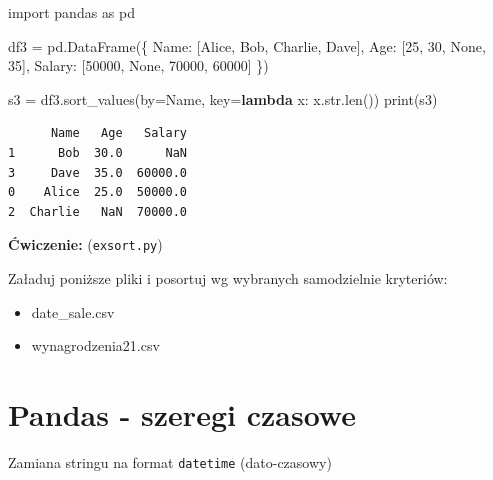 \documentclass[
  polish,
  letterpaper,
  DIV=11,
  numbers=noendperiod]{scrreprt}
\newenvironment{Shaded}{\begin{snugshade}}{\end{snugshade}}
\newcommand{\BuiltInTok}[1]{\textcolor[rgb]{0.00,0.23,0.31}{#1}}
\newcommand{\DecValTok}[1]{\textcolor[rgb]{0.68,0.00,0.00}{#1}}
\newcommand{\ImportTok}[1]{\textcolor[rgb]{0.00,0.46,0.62}{#1}}
\newcommand{\KeywordTok}[1]{\textcolor[rgb]{0.00,0.23,0.31}{\textbf{#1}}}
\newcommand{\NormalTok}[1]{\textcolor[rgb]{0.00,0.23,0.31}{#1}}
\newcommand{\OperatorTok}[1]{\textcolor[rgb]{0.37,0.37,0.37}{#1}}
\newcommand{\StringTok}[1]{\textcolor[rgb]{0.13,0.47,0.30}{#1}}
\newcommand{\VariableTok}[1]{\textcolor[rgb]{0.07,0.07,0.07}{#1}}
\begin{document}
\begin{Shaded}
\begin{Highlighting}[]
\ImportTok{import}\NormalTok{ pandas }\ImportTok{as}\NormalTok{ pd}

\NormalTok{df3 }\OperatorTok{=}\NormalTok{ pd.DataFrame(\{}
    \StringTok{\textquotesingle{}Name\textquotesingle{}}\NormalTok{: [}\StringTok{\textquotesingle{}Alice\textquotesingle{}}\NormalTok{, }\StringTok{\textquotesingle{}Bob\textquotesingle{}}\NormalTok{, }\StringTok{\textquotesingle{}Charlie\textquotesingle{}}\NormalTok{, }\StringTok{\textquotesingle{}Dave\textquotesingle{}}\NormalTok{],}
    \StringTok{\textquotesingle{}Age\textquotesingle{}}\NormalTok{: [}\DecValTok{25}\NormalTok{, }\DecValTok{30}\NormalTok{, }\VariableTok{None}\NormalTok{, }\DecValTok{35}\NormalTok{],}
    \StringTok{\textquotesingle{}Salary\textquotesingle{}}\NormalTok{: [}\DecValTok{50000}\NormalTok{, }\VariableTok{None}\NormalTok{, }\DecValTok{70000}\NormalTok{, }\DecValTok{60000}\NormalTok{]}
\NormalTok{\})}

\NormalTok{s3 }\OperatorTok{=}\NormalTok{ df3.sort\_values(by}\OperatorTok{=}\StringTok{\textquotesingle{}Name\textquotesingle{}}\NormalTok{, key}\OperatorTok{=}\KeywordTok{lambda}\NormalTok{ x: x.}\BuiltInTok{str}\NormalTok{.}\BuiltInTok{len}\NormalTok{())}
\BuiltInTok{print}\NormalTok{(s3)}
\end{Highlighting}
\end{Shaded}

\begin{verbatim}
      Name   Age   Salary
1      Bob  30.0      NaN
3     Dave  35.0  60000.0
0    Alice  25.0  50000.0
2  Charlie   NaN  70000.0
\end{verbatim}

\textbf{Ćwiczenie:} (\texttt{exsort.py})

Załaduj poniższe pliki i posortuj wg wybranych samodzielnie kryteriów:

\begin{itemize}
\item
  date\_sale.csv
\item
  wynagrodzenia21.csv
\end{itemize}

\chapter{Pandas - szeregi czasowe}\label{pandas---szeregi-czasowe}

Zamiana stringu na format \texttt{datetime} (dato-czasowy)
\end{document}
